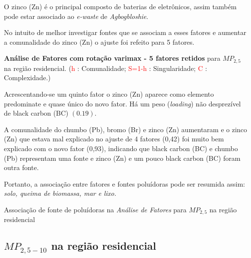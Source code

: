 O zinco (Zn) é o principal composto de baterias de eletrônicos, assim também 
pode estar associado ao \textit{e-waste} de \textit{Agbogbloshie}.

No intuito de melhor investigar fontes que se associam a esses fatores e aumentar
a comunalidade do zinco (Zn) o ajuste foi refeito para 5 fatores.

\begin{table}[H]
  \caption{\textbf{Análise de Fatores com rotação varimax - 5 fatores retidos} 
            para $MP_{2,5}$ na região residencial.
           (\textcolor{red}{h} : Comunalidade; 
           \textcolor{red}{S=1-h} : Singularidade; 
           \textcolor{red}{C} : Complexidade.)}
  
\end{table}

Acrescentando-se um quinto fator o zinco (Zn) aparece como elemento predominate 
e quase único do novo fator. Há um peso (\textit{loading}) não desprezível de 
black carbon (BC) $(0.19)$. 

A comunalidade do chumbo (Pb), bromo (Br) e zinco (Zn) aumentaram e o zinco (Zn)
que estava mal explicado no ajuste de 4 fatores (0,42) foi muito bem explicado
com o novo fator (0,93), indicando que black carbon (BC) e chumbo (Pb) representam 
uma fonte e zinco (Zn) e um pouco black carbon (BC) foram outra fonte.  

Portanto, a associação entre fatores e fontes poluídoras pode ser resumida
assim: \textit{solo, queima de biomassa, mar e lixo.}

\begin{table}[H]
  \centering
  \caption{Associação de fonte de poluídoras na \textit{Análise de Fatores}
         para $MP_{2,5}$ na região residencial}
  
\end{table}

\subsection{$MP_{2,5-10}$ na região residencial}





%
%
%
%

